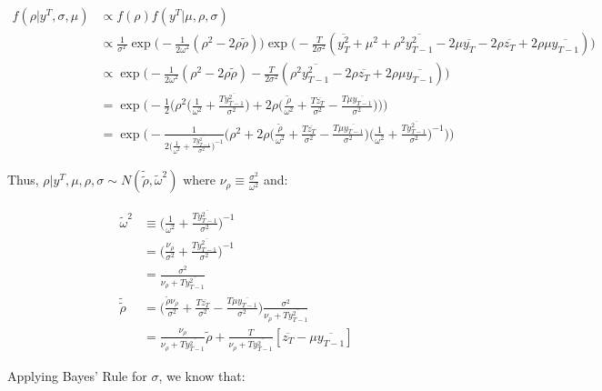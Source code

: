 \documentclass{article}
\begin{document}
\begin{enumerate}
\begin{align*}
f(\rho|y^T, \sigma, \mu) &\propto f(\rho) f(y^T|\mu, \rho, \sigma)\\
&\propto \frac{1}{\sigma^T} \exp \Bigg( - \frac{1}{2\omega^2} (\rho^2 - 2\rho \tilde \rho) \Bigg) \exp \Bigg( - \frac{T}{2 \sigma^2} (\overline{y_T^2} + \mu^2  + \rho^2 \overline{y_{T-1}^2} - 2\mu \overline{ y_T } - 2 \rho \overline{ z_T} + 2\rho \mu \overline{y_{T-1}})\Bigg)\\
&\propto \exp \Bigg( - \frac{1}{2\omega^2} (\rho^2 - 2\rho \tilde \rho) - \frac{T}{2 \sigma^2} (\rho^2 \overline{y_{T-1}^2} - 2 \rho \overline{ z_T} + 2\rho \mu \overline{y_{T-1}})\Bigg) \\
&= \exp \Bigg(-\frac{1}{2}  \Bigg(\rho^2 \Bigg(\frac{1}{\omega^2} + \frac{T\overline{y_{T-1}^2}}{\sigma^2}\Bigg)  +  2\rho\Bigg( \frac{\tilde\rho}{\omega^2} + \frac{T\overline{ z_T}}{\sigma^2} - \frac{T\mu\overline{y_{T-1}}}{\sigma^2} \Bigg)\Bigg)\Bigg)\\
&= \exp \Bigg(-\frac{1}{2\Big(\frac{1}{\omega^2} + \frac{T\overline{y_{T-1}^2}}{\sigma^2}\Big)^{-1}}  \Bigg(\rho^2   +  2\rho\Bigg( \frac{\tilde\rho}{\omega^2} + \frac{T\overline{ z_T}}{\sigma^2} - \frac{T\mu\overline{y_{T-1}}}{\sigma^2} \Bigg)\Bigg(\frac{1}{\omega^2} + \frac{T\overline{y_{T-1}^2}}{\sigma^2}\Bigg)^{-1}\Bigg)\Bigg)
\end{align*}

Thus, $\rho | y^T, \mu, \rho, \sigma \sim N(\tilde{\tilde{\rho}}, \tilde{\omega}^2)$ where $\nu_\rho\equiv \frac{\sigma^2}{\omega^2}$ and:

\begin{align*}
\tilde{\omega}^2
&\equiv \Bigg(\frac{1}{\omega^2} + \frac{T\overline{y_{T-1}^2}}{\sigma^2}\Bigg)^{-1}\\
&= \Bigg(\frac{\nu_\rho}{\sigma^2} + \frac{T\overline{y_{T-1}^2}}{\sigma^2}\Bigg)^{-1}\\
&= \frac{\sigma^2}{\nu_\rho + T\overline{y_{T-1}^2}}\\
\tilde{\tilde{\rho}}
&= \Bigg( \frac{\tilde\rho\nu_\rho}{\sigma^2} + \frac{T\overline{ z_T}}{\sigma^2} - \frac{T\mu\overline{y_{T-1}}}{\sigma^2} \Bigg)  \frac{\sigma^2}{\nu_\rho + T\overline{y_{T-1}^2}}\\
&=  \frac{\nu_\rho}{\nu_\rho + T\overline{y_{T-1}^2}}\tilde\rho + \frac{T}{\nu_\rho + T\overline{y_{T-1}^2}} [\overline{ z_T} - \mu\overline{y_{T-1}}]
\end{align*}

Applying Bayes' Rule for $\sigma$, we know that:


\end{enumerate}
\end{document}
